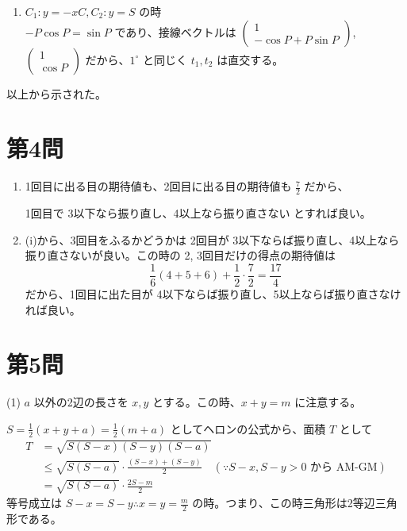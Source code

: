 \documentclass[../main.tex]{subfiles}
\begin{document}
\begin{enumerate}
  \item[$4^\circ$] $C_1 : y = -xC, C_2 : y = S$ の時\\
    $-P \cos P = \sin P$ であり、接線ベクトルは $
    \begin{pmatrix} 1 \\ -\cos P + P \sin P
    \end{pmatrix}$, $
    \begin{pmatrix} 1 \\ \cos P
    \end{pmatrix}$ だから、$1^\circ$ と同じく $t_1, t_2$ は直交する。
\end{enumerate}

\noindent
以上から示された。

\newpage

\section*{第4問}

\noindent
[\textbf{解}]
\begin{enumerate}
  \item[(i)] 1回目に出る目の期待値も、2回目に出る目の期待値も $\frac{7}{2}$ だから、

    1回目で 3以下なら振り直し、4以上なら振り直さない とすれば良い。

  \item[(ii)] (i)から、3回目をふるかどうかは 2回目が 3以下ならば振り直し、4以上なら振り直さないが良い。この時の 2, 3回目だけの得点の期待値は
    \[
      \frac{1}{6}(4+5+6) + \frac{1}{2} \cdot \frac{7}{2} = \frac{17}{4}
    \]
    だから、1回目に出た目が 4以下ならば振り直し、5以上ならば振り直さなければ良い。
\end{enumerate}

\newpage

\section*{第5問}

\noindent
[\textbf{解}] (1) $a$ 以外の2辺の長さを $x, y$ とする。この時、$x + y = m$ に注意する。

\noindent
$S = \frac{1}{2}(x+y+a) = \frac{1}{2}(m+a)$ としてヘロンの公式から、面積 $T$ として
\begin{align*}
  T &= \sqrt{S(S-x)(S-y)(S-a)} \\
  &\le \sqrt{S(S-a)} \cdot \frac{(S-x)+(S-y)}{2} \quad (\because S-x, S-y > 0 \text{ から AM-GM}) \\
  &= \sqrt{S(S-a)} \cdot \frac{2S-m}{2}
\end{align*}
等号成立は $S-x = S-y \therefore x=y=\frac{m}{2}$ の時。つまり、この時三角形は2等辺三角形である。
\end{document}
